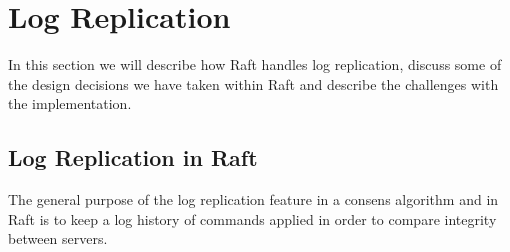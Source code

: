 \section{Log Replication} %
\label{sec:log_replication}

In this section we will describe how Raft handles log replication, discuss some of the design decisions we have taken within Raft and describe the challenges with the implementation.

\subsection{Log Replication in Raft} %
\label{sub:log_replication_in_raft}

The general purpose of the log replication feature in a consens algorithm and in Raft is to keep a log history of commands applied in order to compare integrity between servers.




